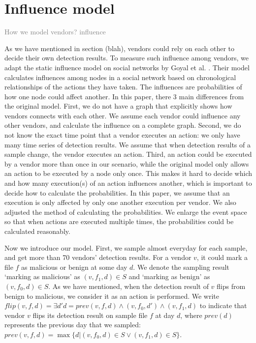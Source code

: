 \section{Influence model}


\textcolor{gray}{How we model vendors? influence}

As we have mentioned in section (blah), vendors could rely on each other to decide their own detection results. 
To measure such influence among vendors, we adapt the static influence model on social networks by Goyal et al. \cite{goyal2010learning}. 
Their model calculates influences among nodes in a social network based on chronological relationships of the actions they have taken.
The influences are probabilities of how one node could affect another.
In this paper, there 3 main differences from the original model. 
First, we do not have a graph that explicitly shows how vendors connects with each other. 
We assume each vendor could influence any other vendors, and calculate the influence on a complete graph. 
Second, we do not know the exact time point that a vendor executes an action: we only have many time series of detection results. 
We assume that when detection results of a sample change, the vendor executes an action.
Third, an action could be executed by a vendor more than once in our scenario, while the original model only allows an action to be executed by a node only once. 
This makes it hard to decide which and how many execution(s) of an action influences another, which is important to decide how to calculate the probabilities.
In this paper, we assume that an execution is only affected by only one another execution per vendor.
We also adjusted the method of calculating the probabilities. We enlarge the event space so that when actions are executed multiple times, the probabilities could be calculated reasonably. 


Now we introduce our model. First, we sample almost everyday for each sample, and get more than 70 vendors' detection results. 
For a vendor $v$, it could mark a file $f$ as malicious or benign at some day $d$. 
We denote the sampling result `marking as malicious' as $(v, f_1, d) \in S$ and `marking as benign' as $(v, f_0, d) \in S$. 
As we have mentioned, when the detection result of $v$ flips from benign to malicious, we consider it as an action is performed. We write 
$flip(v, f, d) = \exists d' d=prev(v, f, d) \land (v, f_0, d') \land (v, f_1, d) $ to indicate that vendor $v$ flips its detection result on sample file $f$ at day $d$, where $prev(d)$ represents the previous day that we sampled: 
$prev(v, f, d) = \max \{d| (v, f_0, d)\in S \lor (v, f_1, d)\in S\}$.


